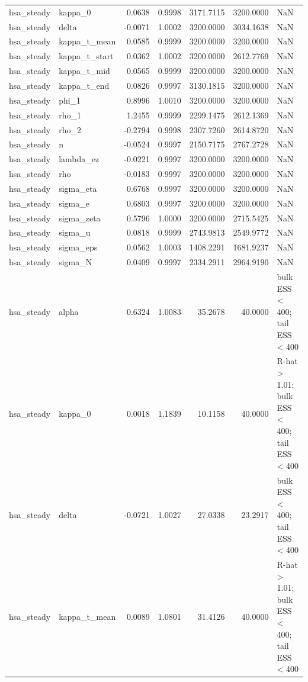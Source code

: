 \begin{tabular}{llrrrrl}
hsa\_steady & kappa\_0 & 0.0638 & 0.9998 & 3171.7115 & 3200.0000 & NaN \\
hsa\_steady & delta & -0.0071 & 1.0002 & 3200.0000 & 3034.1638 & NaN \\
hsa\_steady & kappa\_t\_mean & 0.0585 & 0.9999 & 3200.0000 & 3200.0000 & NaN \\
hsa\_steady & kappa\_t\_start & 0.0362 & 1.0002 & 3200.0000 & 2612.7769 & NaN \\
hsa\_steady & kappa\_t\_mid & 0.0565 & 0.9999 & 3200.0000 & 3200.0000 & NaN \\
hsa\_steady & kappa\_t\_end & 0.0826 & 0.9997 & 3130.1815 & 3200.0000 & NaN \\
hsa\_steady & phi\_1 & 0.8996 & 1.0010 & 3200.0000 & 3200.0000 & NaN \\
hsa\_steady & rho\_1 & 1.2455 & 0.9999 & 2299.1475 & 2612.1369 & NaN \\
hsa\_steady & rho\_2 & -0.2794 & 0.9998 & 2307.7260 & 2614.8720 & NaN \\
hsa\_steady & n & -0.0524 & 0.9997 & 2150.7175 & 2767.2728 & NaN \\
hsa\_steady & lambda\_ez & -0.0221 & 0.9997 & 3200.0000 & 3200.0000 & NaN \\
hsa\_steady & rho & -0.0183 & 0.9997 & 3200.0000 & 3200.0000 & NaN \\
hsa\_steady & sigma\_eta & 0.6768 & 0.9997 & 3200.0000 & 3200.0000 & NaN \\
hsa\_steady & sigma\_e & 0.6803 & 0.9997 & 3200.0000 & 3200.0000 & NaN \\
hsa\_steady & sigma\_zeta & 0.5796 & 1.0000 & 3200.0000 & 2715.5425 & NaN \\
hsa\_steady & sigma\_u & 0.0818 & 0.9999 & 2743.9813 & 2549.9772 & NaN \\
hsa\_steady & sigma\_eps & 0.0562 & 1.0003 & 1408.2291 & 1681.9237 & NaN \\
hsa\_steady & sigma\_N & 0.0409 & 0.9997 & 2334.2911 & 2964.9190 & NaN \\
hsa\_steady & alpha & 0.6324 & 1.0083 & 35.2678 & 40.0000 & bulk ESS < 400; tail ESS < 400 \\
hsa\_steady & kappa\_0 & 0.0018 & 1.1839 & 10.1158 & 40.0000 & R-hat > 1.01; bulk ESS < 400; tail ESS < 400 \\
hsa\_steady & delta & -0.0721 & 1.0027 & 27.0338 & 23.2917 & bulk ESS < 400; tail ESS < 400 \\
hsa\_steady & kappa\_t\_mean & 0.0089 & 1.0801 & 31.4126 & 40.0000 & R-hat > 1.01; bulk ESS < 400; tail ESS < 400 \\

\end{tabular}
